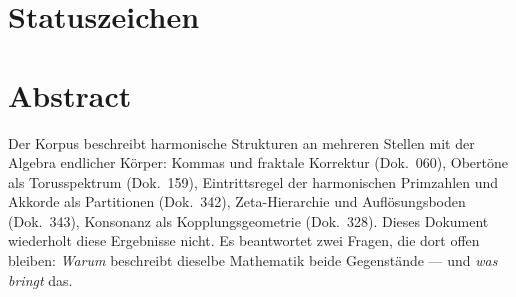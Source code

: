 \providecommand{\BM}{\textbf{[B]}}
\providecommand{\KM}{\textbf{[K]}}
\providecommand{\SM}{\textbf{[S]}}
\providecommand{\XM}{\textbf{[X]}}
\providecommand{\QM}{\textbf{[Q]}}
\providecommand{\EM}{\textbf{[E]}}

{}

\section*{Statuszeichen}


\section*{Abstract}

Der Korpus beschreibt harmonische Strukturen an mehreren Stellen mit der
Algebra endlicher Körper: Kommas und fraktale Korrektur (Dok.~060),
Obertöne als Torusspektrum (Dok.~159), Eintrittsregel der harmonischen
Primzahlen und Akkorde als Partitionen (Dok.~342), Zeta-Hierarchie und
Auflösungsboden (Dok.~343), Konsonanz als Kopplungsgeometrie (Dok.~328).
Dieses Dokument wiederholt diese Ergebnisse nicht. Es beantwortet zwei
Fragen, die dort offen bleiben: \emph{Warum} beschreibt dieselbe
Mathematik beide Gegenstände --- und \emph{was bringt} das.

